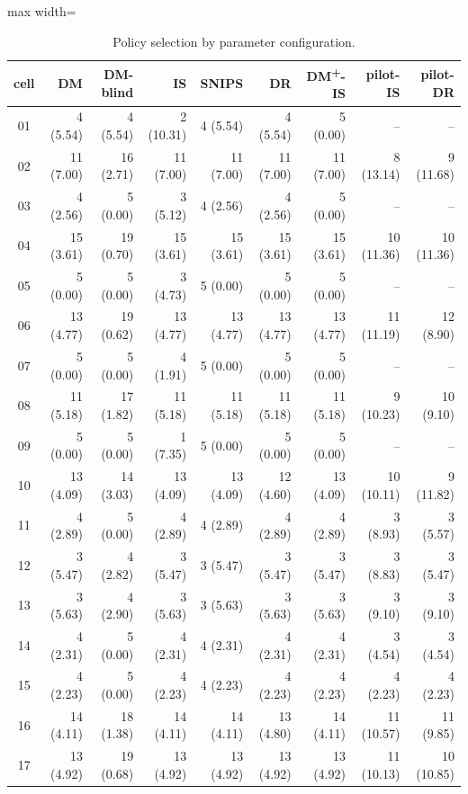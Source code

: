 \begin{table}[!htbp]
\centering
\caption{Policy selection by parameter configuration.}
\label{tab:cellselection}
\footnotesize
\begin{adjustbox}{max width=\linewidth}
\begin{tabular}{crrrrrrrr}
\toprule
cell & DM & DM-blind & IS & SNIPS & DR & DM\textsuperscript{+}-IS & pilot-IS & pilot-DR \\
\midrule
01 & 4 (5.54) & 4 (5.54) & 2 (10.31) & 4 (5.54) & 4 (5.54) & 5 (0.00) & -- & -- \\
02 & 11 (7.00) & 16 (2.71) & 11 (7.00) & 11 (7.00) & 11 (7.00) & 11 (7.00) & 8 (13.14) & 9 (11.68) \\
03 & 4 (2.56) & 5 (0.00) & 3 (5.12) & 4 (2.56) & 4 (2.56) & 5 (0.00) & -- & -- \\
04 & 15 (3.61) & 19 (0.70) & 15 (3.61) & 15 (3.61) & 15 (3.61) & 15 (3.61) & 10 (11.36) & 10 (11.36) \\
05 & 5 (0.00) & 5 (0.00) & 3 (4.73) & 5 (0.00) & 5 (0.00) & 5 (0.00) & -- & -- \\
06 & 13 (4.77) & 19 (0.62) & 13 (4.77) & 13 (4.77) & 13 (4.77) & 13 (4.77) & 11 (11.19) & 12 (8.90) \\
07 & 5 (0.00) & 5 (0.00) & 4 (1.91) & 5 (0.00) & 5 (0.00) & 5 (0.00) & -- & -- \\
08 & 11 (5.18) & 17 (1.82) & 11 (5.18) & 11 (5.18) & 11 (5.18) & 11 (5.18) & 9 (10.23) & 10 (9.10) \\
09 & 5 (0.00) & 5 (0.00) & 1 (7.35) & 5 (0.00) & 5 (0.00) & 5 (0.00) & -- & -- \\
10 & 13 (4.09) & 14 (3.03) & 13 (4.09) & 13 (4.09) & 12 (4.60) & 13 (4.09) & 10 (10.11) & 9 (11.82) \\
11 & 4 (2.89) & 5 (0.00) & 4 (2.89) & 4 (2.89) & 4 (2.89) & 4 (2.89) & 3 (8.93) & 3 (5.57) \\
12 & 3 (5.47) & 4 (2.82) & 3 (5.47) & 3 (5.47) & 3 (5.47) & 3 (5.47) & 3 (8.83) & 3 (5.47) \\
13 & 3 (5.63) & 4 (2.90) & 3 (5.63) & 3 (5.63) & 3 (5.63) & 3 (5.63) & 3 (9.10) & 3 (9.10) \\
14 & 4 (2.31) & 5 (0.00) & 4 (2.31) & 4 (2.31) & 4 (2.31) & 4 (2.31) & 3 (4.54) & 3 (4.54) \\
15 & 4 (2.23) & 5 (0.00) & 4 (2.23) & 4 (2.23) & 4 (2.23) & 4 (2.23) & 4 (2.23) & 4 (2.23) \\
16 & 14 (4.11) & 18 (1.38) & 14 (4.11) & 14 (4.11) & 13 (4.80) & 14 (4.11) & 11 (10.57) & 11 (9.85) \\
17 & 13 (4.92) & 19 (0.68) & 13 (4.92) & 13 (4.92) & 13 (4.92) & 13 (4.92) & 11 (10.13) & 10 (10.85) \\
\bottomrule
\end{tabular}
\end{adjustbox}
\end{table}
